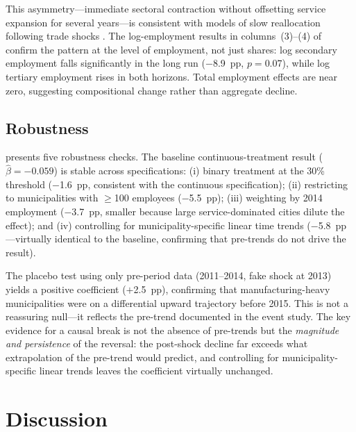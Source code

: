 \documentclass[12pt]{article}
\begin{document}


This asymmetry---immediate sectoral contraction without offsetting service expansion for several years---is consistent with models of slow reallocation following trade shocks \citep{dix-carneiro2017trade}. The log-employment results in columns~(3)--(4) of  confirm the pattern at the level of employment, not just shares: log secondary employment falls significantly in the long run ($-$8.9~pp, $p = 0.07$), while log tertiary employment rises in both horizons. Total employment effects are near zero, suggesting compositional change rather than aggregate decline.

\subsection{Robustness}

 presents five robustness checks. The baseline continuous-treatment result ($\hat{\beta} = -0.059$) is stable across specifications: (i) binary treatment at the 30\% threshold ($-$1.6~pp, consistent with the continuous specification); (ii) restricting to municipalities with $\geq$100 employees ($-$5.5~pp); (iii) weighting by 2014 employment ($-$3.7~pp, smaller because large service-dominated cities dilute the effect); and (iv) controlling for municipality-specific linear time trends ($-$5.8~pp---virtually identical to the baseline, confirming that pre-trends do not drive the result).

The placebo test using only pre-period data (2011--2014, fake shock at 2013) yields a positive coefficient ($+$2.5~pp), confirming that manufacturing-heavy municipalities were on a differential upward trajectory before 2015. This is not a reassuring null---it reflects the pre-trend documented in the event study. The key evidence for a causal break is not the absence of pre-trends but the \textit{magnitude and persistence} of the reversal: the post-shock decline far exceeds what extrapolation of the pre-trend would predict, and controlling for municipality-specific linear trends leaves the coefficient virtually unchanged.




\section{Discussion}
\label{sec:discussion}
\end{document}
